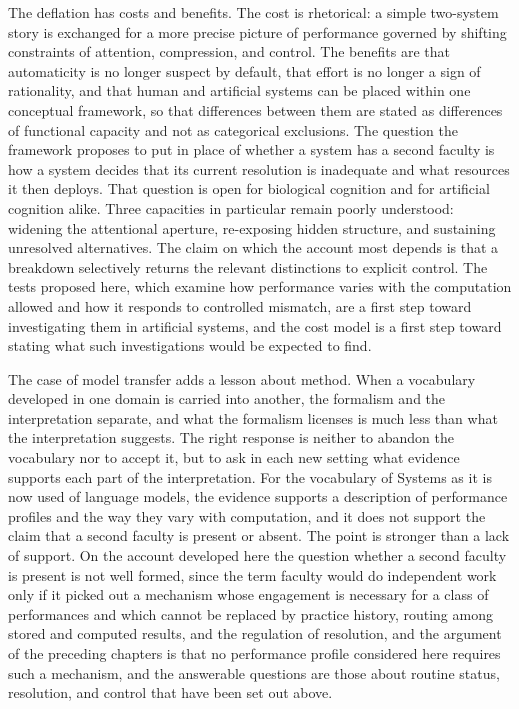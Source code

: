 \documentclass[11pt]{report}
\theoremstyle{remark}
\theoremstyle{definition}
\begin{document}
The deflation has costs and benefits. The cost is rhetorical: a simple two-system story is exchanged for a more precise picture of performance governed by shifting constraints of attention, compression, and control. The benefits are that automaticity is no longer suspect by default, that effort is no longer a sign of rationality, and that human and artificial systems can be placed within one conceptual framework, so that differences between them are stated as differences of functional capacity and not as categorical exclusions. The question the framework proposes to put in place of whether a system has a second faculty is how a system decides that its current resolution is inadequate and what resources it then deploys. That question is open for biological cognition and for artificial cognition alike. Three capacities in particular remain poorly understood: widening the attentional aperture, re-exposing hidden structure, and sustaining unresolved alternatives. The claim on which the account most depends is that a breakdown selectively returns the relevant distinctions to explicit control. The tests proposed here, which examine how performance varies with the computation allowed and how it responds to controlled mismatch, are a first step toward investigating them in artificial systems, and the cost model is a first step toward stating what such investigations would be expected to find.

The case of model transfer adds a lesson about method. When a vocabulary developed in one domain is carried into another, the formalism and the interpretation separate, and what the formalism licenses is much less than what the interpretation suggests. The right response is neither to abandon the vocabulary nor to accept it, but to ask in each new setting what evidence supports each part of the interpretation. For the vocabulary of Systems as it is now used of language models, the evidence supports a description of performance profiles and the way they vary with computation, and it does not support the claim that a second faculty is present or absent. The point is stronger than a lack of support. On the account developed here the question whether a second faculty is present is not well formed, since the term faculty would do independent work only if it picked out a mechanism whose engagement is necessary for a class of performances and which cannot be replaced by practice history, routing among stored and computed results, and the regulation of resolution, and the argument of the preceding chapters is that no performance profile considered here requires such a mechanism, and the answerable questions are those about routine status, resolution, and control that have been set out above.
\end{document}
